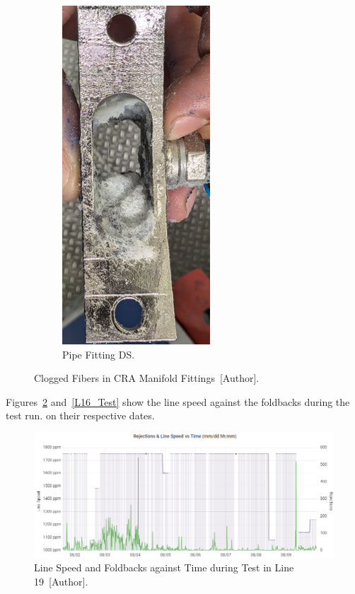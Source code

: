 \begin{figure}[H]
\begin{subfigure}{0.45\textwidth}
    \includegraphics[width=0.7\linewidth]{FIGURES/Fib4.png}
    \caption{Pipe Fitting DS.}
  \end{subfigure}
  \caption{Clogged Fibers in CRA Manifold Fittings~[Author].}
    \label{fibers2}
\end{figure}

Figures~\ref{L19_Test} and~\ref{L16_Test} show the line speed against the foldbacks during the test run. on their respective dates.
\begin{figure}[H]
    \centering
    \includegraphics[width=1\linewidth]{FIGURES/L19_Test.png}
    \caption{Line Speed and Foldbacks against Time during Test in Line 19~[Author].}
    \label{L19_Test}
\end{figure}

